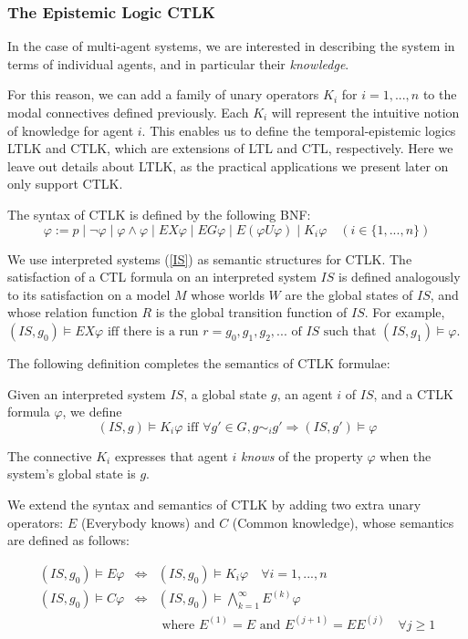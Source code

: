 \documentclass[11pt]{article}
\newenvironment{definition}[1][Definition]{\begin{trivlist}
\item[\hskip \labelsep {\bfseries #1}]}{\end{trivlist}}
\begin{document}
\subsubsection{The Epistemic Logic CTLK}

In the case of multi-agent systems, we are interested in describing the system in terms of individual agents, and in particular their \textit{knowledge}. 

For this reason, we can add \cite{ctlk} a family of unary operators $K_i$ for $i = 1, ..., n$ to the modal connectives defined previously. Each $K_i$ will represent the intuitive notion of knowledge for agent $i$. 
This enables us to define the temporal-epistemic logics LTLK and CTLK, which are extensions of LTL and CTL, respectively. Here we leave out details about LTLK, as the practical applications we present later on only support CTLK. 



\begin{definition} 
The syntax of CTLK is defined by the following BNF: 
$$ \varphi := p \mid \lnot \varphi \mid \varphi \land \varphi \mid EX\varphi \mid EG\varphi \mid E(\varphi U \varphi) \mid  K_i\varphi \quad (i \in \{1, ..., n\})$$
\end{definition}  

We use interpreted systems (\ref{IS}) as semantic structures for CTLK. The satisfaction of a CTL formula on an interpreted system $IS$ is defined analogously to its satisfaction on a model $M$ whose worlds $W$ are the global states of $IS$, and whose relation function $R$ is the global transition function of $IS$. 
For example, $(IS, g_0) \models EX\varphi \mbox{  iff there is a run } r = g_0, g_1, g_2, ... \mbox{ of $IS$ such that } (IS, g_1) \models \varphi$.

The following definition completes the semantics of CTLK formulae:

\begin{definition}
Given an interpreted system $IS$, a global state $g$, an agent $i$ of $IS$, and a CTLK formula $\varphi$, we define
$$(IS, g) \models K_i \varphi \mbox{  iff  } \forall g' \in G, g \sim_i g' \Rightarrow (IS, g') \models \varphi$$

The connective $K_i$ expresses that agent $i$ \emph{knows} of the property $\varphi$ when the system's global state is $g$.

We extend the syntax and semantics of CTLK by adding two extra unary operators: $E$ (Everybody knows) and $C$ (Common knowledge), whose semantics are defined as follows:

\begin{eqnarray*}
(IS, g_0) \models E\varphi &\Leftrightarrow& (IS, g_0) \models K_i \varphi \quad \forall i = 1, ..., n \\
(IS, g_0) \models C\varphi &\Leftrightarrow&  (IS, g_0) \models \bigwedge^\infty_{k = 1} E^{(k)}\varphi \quad \\&& \mbox{ where } E^{(1)} = E \mbox{ and } E^{(j+1)} = EE^{(j)} \quad \forall j \geq 1
\end{eqnarray*}
\end{definition}
\end{document}
